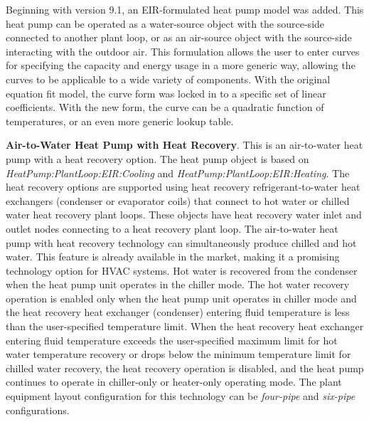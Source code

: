 Beginning with version 9.1, an EIR-formulated heat pump model was added. This heat pump can be operated as a water-source object with the source-side connected to another plant loop, or as an air-source object with the source-side interacting with the outdoor air. This formulation allows the user to enter curves for specifying the capacity and energy usage in a more generic way, allowing the curves to be applicable to a wide variety of components. With the original equation fit model, the curve form was locked in to a specific set of linear coefficients. With the new form, the curve can be a quadratic function of temperatures, or an even more generic lookup table.

\textbf{Air-to-Water Heat Pump with Heat Recovery}. This is an air-to-water heat pump with a heat recovery option. The heat pump object is based on \textit{HeatPump:PlantLoop:EIR:Cooling} and \textit{HeatPump:PlantLoop:EIR:Heating}. The heat recovery options are supported using heat recovery refrigerant-to-water heat exchangers (condenser or evaporator coils) that connect to hot water or chilled water heat recovery plant loops. These objects have heat recovery water inlet and outlet nodes connecting to a heat recovery plant loop. The air-to-water heat pump with heat recovery technology can simultaneously produce chilled and hot water. This feature is already available in the market, making it a promising technology option for HVAC systems. Hot water is recovered from the condenser when the heat pump unit operates in the chiller mode. The hot water recovery operation is enabled only when the heat pump unit operates in chiller mode and the heat recovery heat exchanger (condenser) entering fluid temperature is less than the user-specified temperature limit. When the heat recovery heat exchanger entering fluid temperature exceeds the user-specified maximum limit for hot water temperature recovery or drops below the minimum temperature limit for chilled water recovery, the heat recovery operation is disabled, and the heat pump continues to operate in chiller-only or heater-only operating mode. The plant equipment layout configuration for this technology can be \textit{four-pipe} and \textit{six-pipe} configurations.


